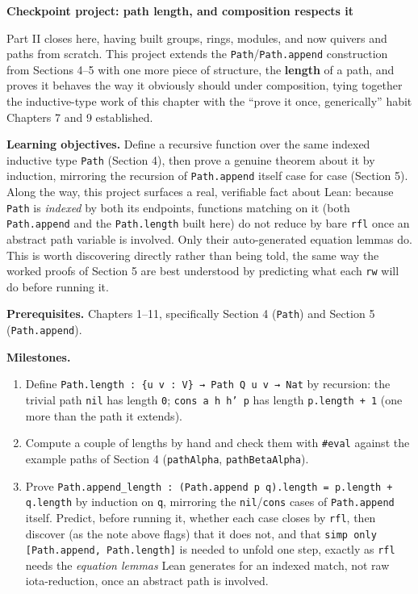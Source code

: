\begin{pblproject}
\label{sec:11-path-algebras:07-checkpoint-project:1}
\textbf{\large Checkpoint project: path length, and composition respects it}\par\smallskip


Part II closes here, having built groups, rings, modules, and now quivers and paths from scratch. This project extends the \texttt{Path}/\texttt{Path.append} construction from Sections 4--5 with one more piece of structure, the \textbf{length} of a path, and proves it behaves the way it obviously should under composition, tying together the inductive-type work of this chapter with the ``prove it once, generically'' habit Chapters 7 and 9 established.

\textbf{Learning objectives.} Define a recursive function over the same indexed inductive type \texttt{Path} (Section 4), then prove a genuine theorem about it by induction, mirroring the recursion of \texttt{Path.append} itself case for case (Section 5). Along the way, this project surfaces a real, verifiable fact about Lean: because \texttt{Path} is \emph{indexed} by both its endpoints, functions matching on it (both \texttt{Path.append} and the \texttt{Path.length} built here) do not reduce by bare \texttt{rfl} once an abstract path variable is involved. Only their auto-generated equation lemmas do. This is worth discovering directly rather than being told, the same way the worked proofs of Section 5 are best understood by predicting what each \texttt{rw} will do before running it.

\textbf{Prerequisites.} Chapters 1--11, specifically Section 4 (\texttt{Path}) and Section 5 (\texttt{Path.append}).

\textbf{Milestones.}

\begin{enumerate}
\def\labelenumi{\arabic{enumi}.}
\tightlist
\item
  Define \texttt{Path.length : \{u v : V\} → Path Q u v → Nat} by recursion: the trivial path \texttt{nil} has length \texttt{0}; \texttt{cons a h h' p} has length \texttt{p.length + 1} (one more than the path it extends).
\item
  Compute a couple of lengths by hand and check them with \texttt{\#eval} against the example paths of Section 4 (\texttt{pathAlpha}, \texttt{pathBetaAlpha}).
\item
  Prove \texttt{Path.append\_\allowbreak{}length : (Path.append p q).length = p.length + q.length} by induction on \texttt{q}, mirroring the \texttt{nil}/\texttt{cons} cases of \texttt{Path.append} itself. Predict, before running it, whether each case closes by \texttt{rfl}, then discover (as the note above flags) that it does not, and that \texttt{simp only [Path.append, Path.length]} is needed to unfold one step, exactly as \texttt{rfl} needs the \emph{equation lemmas} Lean generates for an indexed match, not raw iota-reduction, once an abstract path is involved.
\end{enumerate}


\end{pblproject}
